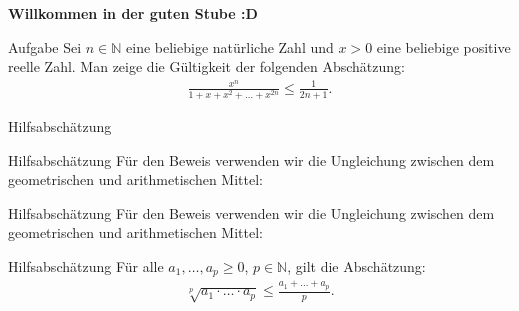 \documentclass[10pt]{beamer}
\title{}
\author{Artur's Mathematikstübchen}
\date{}
\def\bN{\mathbb{N}}
\begin{document}

\begin{frame}
    \begin{center}
        \textbf{\huge Willkommen in der guten Stube \newline \newline :D}
    \end{center}
\end{frame}




\begin{frame}
    \begin{alertblock}{Aufgabe}
        Sei \( n \in \bN \) eine beliebige natürliche Zahl und \( x > 0 \) eine beliebige positive reelle Zahl. Man zeige die Gültigkeit der folgenden Abschätzung:
        \begin{align*}
            \frac{x^{n}}{1 + x + x^{2} + \ldots + x^{2n}}
            \leq \frac{1}{2n + 1}.
        \end{align*}
    \end{alertblock}
\end{frame}



\begin{frame}{Hilfsabschätzung}
    
\end{frame}



\begin{frame}{Hilfsabschätzung}
    Für den Beweis verwenden wir die Ungleichung zwischen dem geometrischen und arithmetischen Mittel:
\end{frame}



\begin{frame}{Hilfsabschätzung}
    Für den Beweis verwenden wir die Ungleichung zwischen dem geometrischen und arithmetischen Mittel:
    \begin{block}{Hilfsabschätzung}
        Für alle \( a_{1}, \ldots, a_{p} \geq 0 \), \( p \in \bN \), gilt die Abschätzung:
        \begin{align*}
            \sqrt[p]{a_{1} \cdot \ldots \cdot a_{p}} 
            \leq \frac{a_{1} + \ldots + a_{p}}{p}.
        \end{align*}
    \end{block}
\end{frame}
\end{document}
